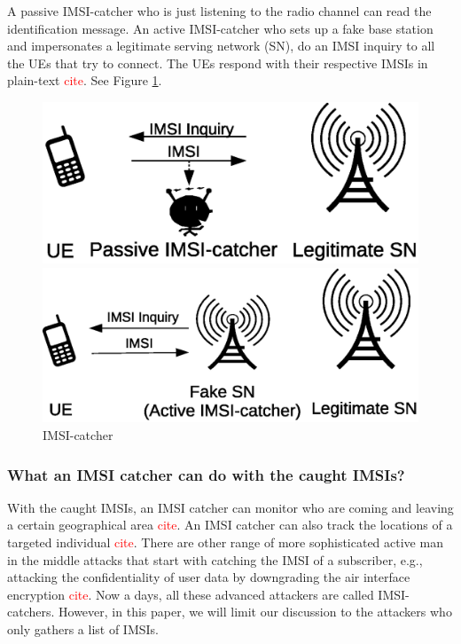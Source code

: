 \documentclass{llncs} %
\begin{document}
A passive IMSI-catcher who is just listening to the radio channel can read the identification message. An active IMSI-catcher who sets up a fake base station and impersonates a legitimate serving network (SN), do an IMSI inquiry to all the UEs that try to connect. The UEs respond with their respective IMSIs in plain-text \textcolor{red}{cite}. See Figure \ref{fig:IMSI-catching}. 

\begin{figure}[!tbp]
  \centering
  \begin{minipage}[b]{0.44\textwidth}
    \includegraphics[width=\textwidth]{Passive_IMSI-Catcher.eps}
  \end{minipage}
  \hfill
  \begin{minipage}[b]{0.50\textwidth}
    \includegraphics[width=\textwidth]{Active-IMSI-Cactcher.eps}
  \end{minipage}
  \caption{IMSI-catcher}
  \label{fig:IMSI-catching}
\end{figure}

\subsubsection{What an IMSI catcher can do with the caught IMSIs?} With the caught IMSIs, an IMSI catcher can monitor who are coming and leaving a certain geographical area \textcolor{red}{cite}. An IMSI catcher can also track the locations of a targeted individual \textcolor{red}{cite}. There are other range of more sophisticated active man in the middle attacks that start with catching the IMSI of a subscriber, e.g., attacking the confidentiality of user data by downgrading the air interface encryption \textcolor{red}{cite}. Now a days, all these advanced attackers are called IMSI-catchers. However, in this paper, we will limit our discussion to the attackers who only gathers a list of IMSIs.
\end{document}
